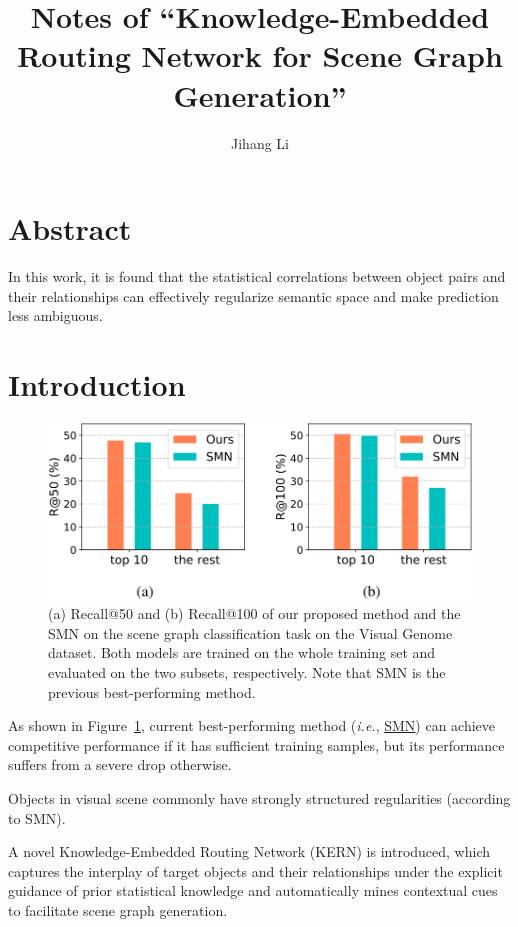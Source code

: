 \documentclass[10pt]{article}
\title{Notes of ``Knowledge-Embedded Routing Network for Scene Graph Generation''}
\author{Jihang Li}
\newcommand{\Fig}[1]{Figure~\ref{fig:#1}}
\begin{document}
\maketitle
\tableofcontents

\section*{Abstract}%
\label{sec:abstract}
In this work, it is found that the statistical correlations between object
pairs and their relationships can effectively regularize semantic  space and
make prediction less ambiguous.

\section{Introduction}%
\label{sec:introduction}
\begin{figure}[htpb]
  \centering
  \includegraphics[width=0.6\linewidth]{fig_1.png}
  \caption{(a) Recall@50 and (b) Recall@100 of our proposed method and the SMN
    on the scene graph classification task on the Visual Genome dataset. Both
    models are trained on the whole training set and evaluated on the two
    subsets, respectively. Note that SMN is the previous best-performing
    method.}%
  \label{fig:1}
\end{figure}

As shown in \Fig{1}, current best-performing method (\textit{i.e.},
\href{https://rowanzellers.com/neuralmotifs/}{SMN}) can achieve competitive
performance if it has sufficient training samples, but its performance suffers
from a severe drop otherwise.

Objects in visual scene commonly have strongly structured regularities
(according to SMN).

A novel Knowledge-Embedded Routing Network (KERN) is introduced, which
captures the interplay of target objects and their relationships under the
explicit guidance of prior statistical knowledge and automatically mines
contextual cues to facilitate scene graph generation.
\end{document}
